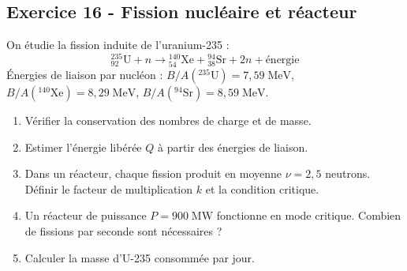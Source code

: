 \documentclass[12pt,a4paper]{article}
\begin{document}
\subsection*{Exercice 16 - Fission nucléaire et réacteur \niveau{\difficile}}

\begin{boiteexercice}
On étudie la fission induite de l'uranium-235 :
\[
{}^{235}_{92}\text{U} + n \rightarrow {}^{140}_{54}\text{Xe} + {}^{94}_{38}\text{Sr} + 2n + \text{énergie}
\]
Énergies de liaison par nucléon : $B/A({}^{235}\text{U})=7{,}59\;\text{MeV}$, $B/A({}^{140}\text{Xe})=8{,}29\;\text{MeV}$, $B/A({}^{94}\text{Sr})=8{,}59\;\text{MeV}$.
\begin{enumerate}
  \item Vérifier la conservation des nombres de charge et de masse.
  \item Estimer l'énergie libérée $Q$ à partir des énergies de liaison.
  \item Dans un réacteur, chaque fission produit en moyenne $\nu=2{,}5$ neutrons. Définir le facteur de multiplication $k$ et la condition critique.
  \item Un réacteur de puissance $P=900\;\text{MW}$ fonctionne en mode critique. Combien de fissions par seconde sont nécessaires ?
  \item Calculer la masse d'U-235 consommée par jour.
\end{enumerate}
\end{boiteexercice}
\end{document}
